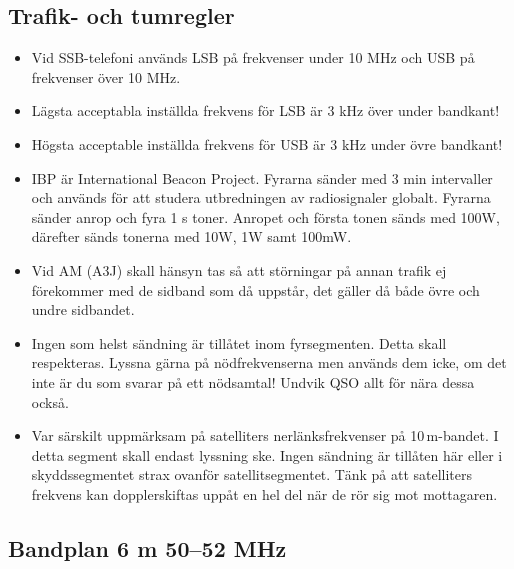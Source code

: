 \subsection{Trafik- och tumregler}

\begin{itemize}
\item Vid SSB-telefoni används LSB på frekvenser under 10 MHz och USB
      på frekvenser över 10 MHz.
\item Lägsta acceptabla inställda frekvens för LSB är 3 kHz över
      under bandkant!
\item Högsta acceptable inställda frekvens för USB är 3 kHz under
      övre bandkant!
\item IBP är International Beacon Project. Fyrarna sänder med 3 min
      intervaller och används för att studera utbredningen av
      radiosignaler globalt. Fyrarna sänder anrop och fyra 1 s toner.
      Anropet och första tonen sänds med 100W, därefter sänds tonerna
      med 10W, 1W samt 100mW.
\item Vid AM (A3J) skall hänsyn tas så att störningar på annan trafik ej fö\-re\-kom\-mer
      med de sidband som då uppstår, det gäller då både övre och undre
      sidbandet.
\item Ingen som helst sändning är tillåtet inom fyrsegmenten. Detta skall respekteras.
      Lyssna gärna på nödfrekvenserna men används dem icke, om det
      inte är du som svarar på ett nödsamtal! Undvik QSO allt för nära
      dessa också.
\item Var särskilt uppmärksam på satelliters nerlänksfrekvenser på 10\,m-bandet.
      I detta segment skall endast lyssning ske. Ingen sändning är
      tillåten här eller i skyddssegmentet strax ovanför
      satellitsegmentet. Tänk på att satelliters frekvens kan
      dopplerskiftas uppåt en hel del när de rör sig mot mottagaren.
\end{itemize}

\subsection{Bandplan 6 m 50--52 MHz}

